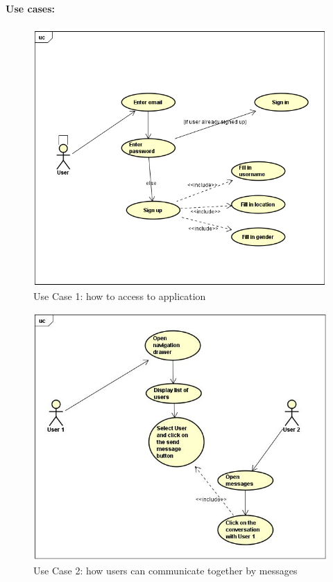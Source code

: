 \documentclass[paper=a4, fontsize=12pt,DIV=14]{scrartcl}    %
\begin{document}
        			\paragraph{Use cases:}
        			\paragraph{}

		                \begin{figure}[!htbp]
		                    \center
		                    \includegraphics[scale=0.75]{img/enter_application.png}
		                    \caption{Use Case 1: how to access to application}
		                \end{figure}

		                \begin{figure}[!htbp]
		                    \center
		                    \includegraphics[scale=0.7]{img/send_message.png}
		                    \caption{Use Case 2: how users can communicate together by messages}
		                \end{figure}
\end{document}
